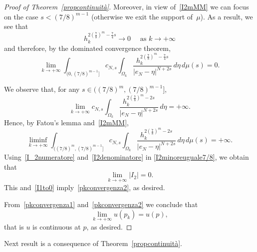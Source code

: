 \documentclass[12pt,a4paper,intlimits,sumlimits]{amsart}
\theoremstyle{definition}
\theoremstyle{plain}
\numberwithin{equation}{section}
\begin{document}
\begin{proof}[Proof of Theorem~\ref{propcontinuità}]
Moreover, in view of~\eqref{I2mMM} we can focus on the case $s<(7/8)^{m-1}$
(otherwise we exit the support of~$\mu$).
As a result, we see that $$h_k^{2\left(\frac{7}{8}\right)^m-\frac{7}{4}s}\to 0
\quad{\mbox{ as $k\to +\infty$}}$$ and therefore, by the
dominated convergence theorem,
\begin{equation}\label{I_2numeratore}
\lim_{k\to+\infty}
\displaystyle\int_{(0,(7/8)^{m-1}]}c_{N,s}\int_{\Omega_k}\dfrac{h_k^{2\left(\frac{7}{8}\right)^m-\frac{7}{4}s}}{|e_N-\eta|^{N+2s}}\,d\eta\,d\mu(s)=0.
\end{equation}

We observe that, for any $s\in ((7/8)^{m},(7/8)^{m-1}]$, 
\[
\lim_{k\to +\infty} c_{N,s}\int_{\Omega_k}\dfrac{h_k^{2\left(\frac{7}{8}\right)^m-2s}}{|e_N-\eta|^{N+2s}}\,d\eta=+\infty.
\]
Hence, by Fatou's lemma and~\eqref{I2mMM},
\begin{equation}\label{I2denominatore}
\liminf_{k\to+\infty}
\int_{((7/8)^{m},(7/8)^{m-1}]}c_{N,s}\int_{\Omega_k}\dfrac{h_k^{2\left(\frac{7}{8}\right)^m-2s}}{|e_N-\eta|^{N+2s}}\,d\eta\,d\mu(s)=+\infty.
\end{equation}
Using~\eqref{I_2numeratore} and~\eqref{I2denominatore} in
\eqref{I2minoreuguale7/8}, we obtain that
\begin{equation}\label{LIMI2}
\lim_{k\to+\infty} |I_2|=0.
\end{equation}
This and~\eqref{I1to0} imply~\eqref{pkconvergenza2}, as desired.

{F}rom~\eqref{pkconvergenza1} and~\eqref{pkconvergenza2} we
conclude that
\[
\lim_{k\to+\infty}u(p_k)=u(p),
\]
that is $u$ is continuous at $p$, as desired.
\end{proof}

Next result is a consequence of Theorem~\ref{propcontinuità}.
\end{document}

